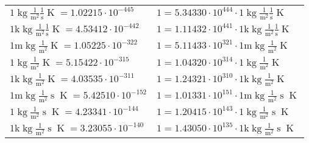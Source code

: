 \begin{center}
\begin{longtable}{l l}
{\color{black}$1 \bm{\mathrm{ }}\operatorname{kg}\frac1{\operatorname{m}^2}\frac1{\operatorname{s}}{}{\operatorname{K}} = 1.02215\cdot10^{-445} $}   & {\color{black}$ 1 = 5.34330\cdot10^{444} \cdot 1 \bm{\mathrm{ }}\operatorname{kg}\frac1{\operatorname{m}^2}\frac1{\operatorname{s}}{}{\operatorname{K}}$}  \\
{\color{gray}$1 \bm{\mathrm{ k}}\operatorname{kg}\frac1{\operatorname{m}^2}\frac1{\operatorname{s}}{}{\operatorname{K}} = 4.53412\cdot10^{-442} $}   & {\color{gray}$ 1 = 1.11432\cdot10^{441} \cdot 1 \bm{\mathrm{ k}}\operatorname{kg}\frac1{\operatorname{m}^2}\frac1{\operatorname{s}}{}{\operatorname{K}}$}  \\
{\color{gray}$1 \bm{\mathrm{ m}}\operatorname{kg}\frac1{\operatorname{m}^2}{}{}{\operatorname{K}} = 1.05225\cdot10^{-322} $}   & {\color{gray}$ 1 = 5.11433\cdot10^{321} \cdot 1 \bm{\mathrm{ m}}\operatorname{kg}\frac1{\operatorname{m}^2}{}{}{\operatorname{K}}$}  \\
{\color{black}$1 \bm{\mathrm{ }}\operatorname{kg}\frac1{\operatorname{m}^2}{}{}{\operatorname{K}} = 5.15422\cdot10^{-315} $}   & {\color{black}$ 1 = 1.04320\cdot10^{314} \cdot 1 \bm{\mathrm{ }}\operatorname{kg}\frac1{\operatorname{m}^2}{}{}{\operatorname{K}}$}  \\
{\color{gray}$1 \bm{\mathrm{ k}}\operatorname{kg}\frac1{\operatorname{m}^2}{}{}{\operatorname{K}} = 4.03535\cdot10^{-311} $}   & {\color{gray}$ 1 = 1.24321\cdot10^{310} \cdot 1 \bm{\mathrm{ k}}\operatorname{kg}\frac1{\operatorname{m}^2}{}{}{\operatorname{K}}$}  \\
{\color{gray}$1 \bm{\mathrm{ m}}\operatorname{kg}\frac1{\operatorname{m}^2}{\operatorname{s}}{}{\operatorname{K}} = 5.42510\cdot10^{-152} $}   & {\color{gray}$ 1 = 1.01331\cdot10^{151} \cdot 1 \bm{\mathrm{ m}}\operatorname{kg}\frac1{\operatorname{m}^2}{\operatorname{s}}{}{\operatorname{K}}$}  \\
{\color{black}$1 \bm{\mathrm{ }}\operatorname{kg}\frac1{\operatorname{m}^2}{\operatorname{s}}{}{\operatorname{K}} = 4.23341\cdot10^{-144} $}   & {\color{black}$ 1 = 1.20415\cdot10^{143} \cdot 1 \bm{\mathrm{ }}\operatorname{kg}\frac1{\operatorname{m}^2}{\operatorname{s}}{}{\operatorname{K}}$}  \\
{\color{gray}$1 \bm{\mathrm{ k}}\operatorname{kg}\frac1{\operatorname{m}^2}{\operatorname{s}}{}{\operatorname{K}} = 3.23055\cdot10^{-140} $}   & {\color{gray}$ 1 = 1.43050\cdot10^{135} \cdot 1 \bm{\mathrm{ k}}\operatorname{kg}\frac1{\operatorname{m}^2}{\operatorname{s}}{}{\operatorname{K}}$}  \\

\end{longtable}
\end{center}
